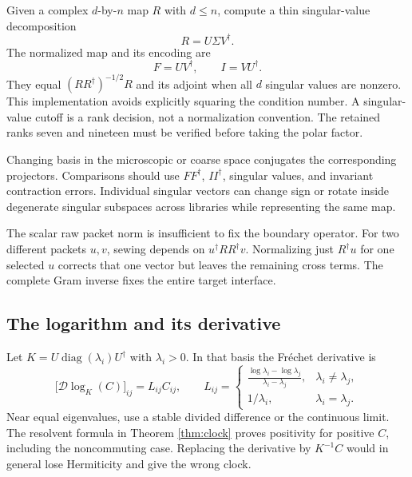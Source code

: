 Given a complex $d$-by-$n$ map $R$ with $d\le n$, compute a thin singular-value decomposition
\begin{equation}
R=U\Sigma V^\dagger.
\end{equation}
The normalized map and its encoding are
\begin{equation}
F=UV^\dagger,\qquad I=VU^\dagger.
\end{equation}
They equal $(RR^\dagger)^{-1/2}R$ and its adjoint when all $d$ singular values are nonzero. This implementation avoids explicitly squaring the condition number. A singular-value cutoff is a rank decision, not a normalization convention. The retained ranks seven and nineteen must be verified before taking the polar factor.

Changing basis in the microscopic or coarse space conjugates the corresponding projectors. Comparisons should use $F F^\dagger$, $I I^\dagger$, singular values, and invariant contraction errors. Individual singular vectors can change sign or rotate inside degenerate singular subspaces across libraries while representing the same map.

The scalar raw packet norm is insufficient to fix the boundary operator. For two different packets $u,v$, sewing depends on
$u^\dagger RR^\dagger v$.
Normalizing just $R^\dagger u$ for one selected $u$ corrects that one vector but leaves the remaining cross terms. The complete Gram inverse fixes the entire target interface.

\subsection{The logarithm and its derivative}

Let $K=U\operatorname{diag}(\lambda_i)U^\dagger$ with $\lambda_i>0$. In that basis the Fréchet derivative is
\begin{equation}
\bigl[\mathcal D\log_K(C)\bigr]_{ij}
=L_{ij}C_{ij},\qquad
L_{ij}=
\begin{cases}
\displaystyle\frac{\log\lambda_i-\log\lambda_j}{\lambda_i-\lambda_j},
&\lambda_i\ne\lambda_j,\\[6pt]
1/\lambda_i,&\lambda_i=\lambda_j.
\end{cases}
\end{equation}
Near equal eigenvalues, use a stable divided difference or the continuous limit. The resolvent formula in Theorem \ref{thm:clock} proves positivity for positive $C$, including the noncommuting case. Replacing the derivative by $K^{-1}C$ would in general lose Hermiticity and give the wrong clock.

